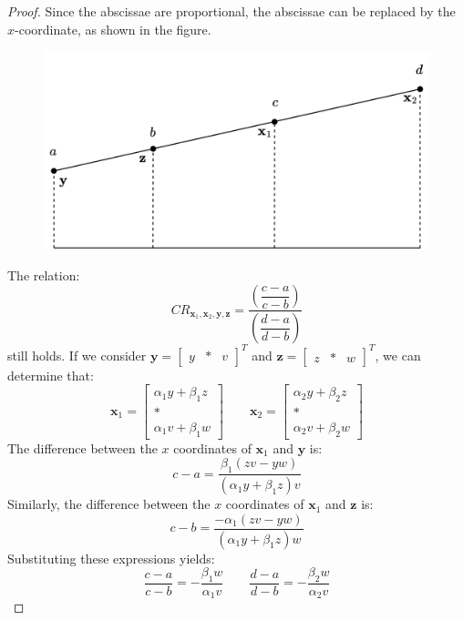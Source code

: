 \begin{proof}  
    Since the abscissae are proportional, the abscissae can be replaced by the $x$-coordinate, as shown in the figure. 
    \begin{figure}[H]
        \centering
        \includegraphics[width=0.5\linewidth]{images/abscissae.png}
    \end{figure}
    The relation:
    \[CR_{\mathbf{x}_1,\mathbf{x}_2,\mathbf{y},\mathbf{z}}=\dfrac{\left(\dfrac{c-a}{c-b}\right)}{\left(\dfrac{d-a}{d-b}\right)}\]
    still holds. 
    If we consider $\mathbf{y}={\begin{bmatrix} y & \ast & v \end{bmatrix}}^T$ and $\mathbf{z}={\begin{bmatrix} z & \ast & w \end{bmatrix}}^T$, we can determine that:
    \[\mathbf{x}_1=\begin{bmatrix} \alpha_1y+\beta_1z \\ \ast \\ \alpha_1v+\beta_1w \end{bmatrix} \qquad \mathbf{x}_2=\begin{bmatrix} \alpha_2y+\beta_2z \\ \ast \\ \alpha_2v+\beta_2w \end{bmatrix}\]
    The difference between the $x$ coordinates of $\mathbf{x}_1$ and $\mathbf{y}$ is:
    \[c-a=\dfrac{\beta_1(zv-yw)}{(\alpha_1y+\beta_1z)v}\]
    Similarly, the difference between the $x$ coordinates of $\mathbf{x}_1$ and $\mathbf{z}$ is:
    \[c-b=\dfrac{-\alpha_1(zv-yw)}{(\alpha_1y+\beta_1z)w}\]
    Substituting these expressions yields:
    \[\dfrac{c-a}{c-b}=-\dfrac{\beta_1w}{\alpha_1v} \qquad \dfrac{d-a}{d-b}=-\dfrac{\beta_2w}{\alpha_2v}\]
\end{proof}